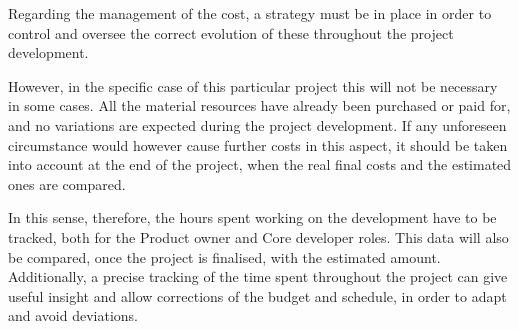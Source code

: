 Regarding the management of the cost, a strategy must be in place in order to control and oversee the correct evolution of these throughout the project development.

However, in the specific case of this particular project this will not be necessary in some cases. All the material resources have already been purchased or paid for, and no variations are expected during the project development. If any unforeseen circumstance would however cause further costs in this aspect, it should be taken into account at the end of the project, when the real final costs and the estimated ones are compared.

In this sense, therefore, the hours spent working on the development have to be tracked, both for the Product owner and Core developer roles. This data will also be compared, once the project is finalised, with the estimated amount. Additionally, a precise tracking of the time spent throughout the project can give useful insight and allow corrections of the budget and schedule, in order to adapt and avoid deviations.